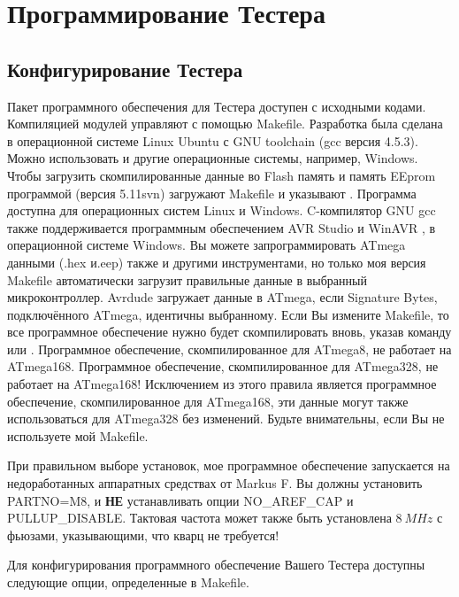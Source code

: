 \chapter{Программирование Тестера}
\label{sec:config}
\section{Конфигурирование Тестера}
Пакет программного обеспечения для Тестера доступен с исходными кодами. Компиляцией модулей управляют с помощью 
Makefile. Разработка была сделана в операционной системе Linux Ubuntu с GNU toolchain (gcc версия 4.5.3). Можно 
использовать и другие операционные системы, например, Windows. Чтобы загрузить скомпилированные данные во Flash 
память и память EEprom программой  (версия 5.11svn) загружают Makefile и указывают . Программа 
 \cite{avrdude} доступна для операционных систем Linux и Windows. C-компилятор GNU gcc также поддерживается 
программным обеспечением AVR Studio и WinAVR \cite{winavr1},\cite{winavr2} в операционной системе Windows. Вы можете 
запрограммировать ATmega данными (.hex и.eep) также и другими инструментами, но только моя версия Makefile 
автоматически загрузит правильные данные в выбранный микроконтроллер. Avrdude загружает данные в ATmega, если 
Signature Bytes, подключённого ATmega, идентичны выбранному. Если Вы измените Makefile, то все программное 
обеспечение нужно будет скомпилировать вновь, указав команду  или . Программное обеспечение, 
скомпилированное для ATmega8, не работает на ATmega168. Программное обеспечение, скомпилированное для ATmega328, 
не работает на ATmega168! Исключением из этого правила является программное обеспечение, скомпилированное для 
ATmega168, эти данные могут также использоваться для ATmega328 без изменений. Будьте внимательны, если Вы не 
используете мой Makefile. 

При правильном выборе установок, мое программное обеспечение запускается на недоработанных аппаратных средствах 
от Markus F.
Вы должны установить PARTNO=M8, и \textbf{ НЕ} устанавливать опции NO\_AREF\_CAP и PULLUP\_DISABLE. 
Тактовая частота может также быть установлена \(8~MHz\) с фьюзами, указывающими, что кварц не требуется! 

Для конфигурирования программного обеспечение Вашего Тестера доступны следующие опции, определенные в Makefile.


